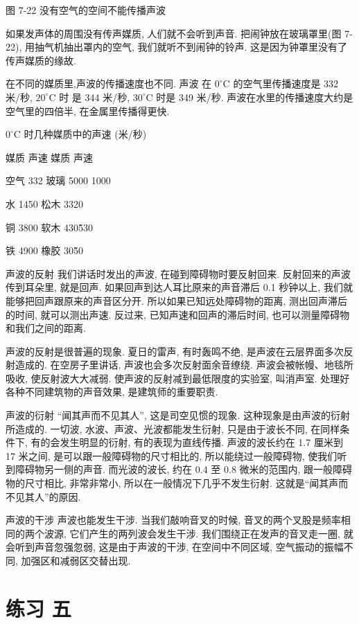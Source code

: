 \documentclass[10pt]{article}
\begin{document}
图 7-22 没有空气的空间不能传播声波

如果发声体的周围没有传声媒质, 人们就不会听到声音. 把闹钟放在玻璃罩里(图 7-22), 用抽气机抽出罩内的空气, 我们就听不到闹钟的铃声. 这是因为钟罩里没有了传声媒质的缘故.

在不同的媒质里,声波的传播速度也不同. 声波 在 \({0}^{ \circ }\mathrm{C}\) 的空气里传播速度是 332 米/秒, \({20}^{ \circ }\mathrm{C}\) 时 是 344 米/秒, \({30}^{ \circ }\mathrm{C}\) 时是 349 米/秒. 声波在水里的传播速度大约是空气里的四倍半, 在金属里传播得更快.

\({0}^{ \circ }\mathrm{C}\) 时几种媒质中的声速 (米/秒)

媒质 声速 媒质 声速

空气 332 玻璃 5000 1000

水 1450 松木 3320

铜 3800 软木 430\~530

铁 4900 橡胶 30\~50

声波的反射 我们讲话时发出的声波, 在碰到障碍物时要反射回来. 反射回来的声波传到耳朵里, 就是回声. 如果回声到达人耳比原来的声音滞后 0.1 秒钟以上, 我们就能够把回声跟原来的声音区分开. 所以如果已知远处障碍物的距离, 测出回声滞后的时间, 就可以测出声速. 反过来, 已知声速和回声的滞后时间, 也可以测量障碍物和我们之间的距离.

声波的反射是很普遍的现象. 夏日的雷声, 有时轰鸣不绝, 是声波在云层界面多次反射造成的. 在空房子里讲话, 声波也会多次反射面余音缭绕. 声波会被帐幔、地毯所吸收, 使反射波大大减弱. 使声波的反射减到最低限度的实验室, 叫消声室. 处理好各种不同建筑物的声音效果, 是建筑师的重要职责.

声波的衍射 “闻其声而不见其人”, 这是司空见惯的现象. 这种现象是由声波的衍射所造成的. 一切波, 水波、声波、光波都能发生衍射, 只是由于波长不同, 在同样条件下, 有的会发生明显的衍射, 有的表现为直线传播. 声波的波长约在 1.7 厘米到 17 米之间, 是可以跟一般障碍物的尺寸相比的, 所以能绕过一般障碍物, 使我们听到障碍物另一侧的声音. 而光波的波长, 约在 0.4 至 0.8 微米的范围内, 跟一般障碍物的尺寸相比, 非常非常小, 所以在一般情况下几乎不发生衍射. 这就是“闻其声而不见其人”的原因.

声波的干涉 声波也能发生干涉. 当我们敲响音叉的时候, 音叉的两个叉股是频率相同的两个波源, 它们产生的两列波会发生干涉. 我们围绕正在发声的音叉走一圈, 就会听到声音忽强忽弱, 这是由于声波的干涉, 在空间中不同区域, 空气振动的振幅不同, 加强区和减弱区交替出现.

\section*{练习 五}
\end{document}
